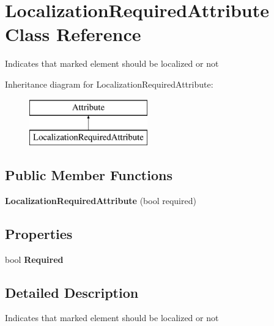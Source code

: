 \hypertarget{class_localization_required_attribute}{}\section{Localization\+Required\+Attribute Class Reference}
\label{class_localization_required_attribute}


Indicates that marked element should be localized or not  


Inheritance diagram for Localization\+Required\+Attribute\+:\begin{figure}[H]
\begin{center}
\leavevmode
\includegraphics[height=2.000000cm]{class_localization_required_attribute}
\end{center}
\end{figure}
\subsection*{Public Member Functions}
\begin{DoxyCompactItemize}
\item 
\hypertarget{class_localization_required_attribute_a7d6235d2f8883d6f6311ca2a95156a9c}{}{\bfseries Localization\+Required\+Attribute} (bool required)\label{class_localization_required_attribute_a7d6235d2f8883d6f6311ca2a95156a9c}

\end{DoxyCompactItemize}
\subsection*{Properties}
\begin{DoxyCompactItemize}
\item 
\hypertarget{class_localization_required_attribute_af8b46c34356964b9b15c22c7e5113d23}{}bool {\bfseries Required}\label{class_localization_required_attribute_af8b46c34356964b9b15c22c7e5113d23}

\end{DoxyCompactItemize}


\subsection{Detailed Description}
Indicates that marked element should be localized or not 


